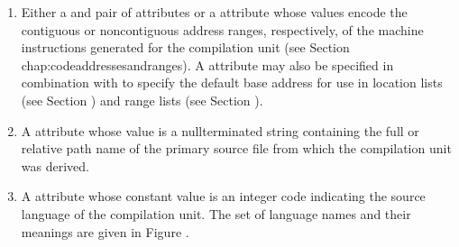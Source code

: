 \begin{enumerate}[1]
\item Either a  and  pair of
attributes or a  attribute whose values encode the
contiguous or non\dash contiguous address ranges, respectively,
of the machine instructions generated for the compilation
unit (see Section {chap:codeaddressesandranges}).  
A  attribute may also
be specified in combination with  to specify the
default base address for use in location lists (see Section
) and range lists 
(see Section ).

\item A  attribute whose value is a null\dash terminated
string containing the full or relative path name of the primary
source file from which the compilation unit was derived.

\item A  attribute whose constant value is an
integer code indicating the source language of the compilation
unit. The set of language names and their meanings are given
in 
Figure .


\end{enumerate}
